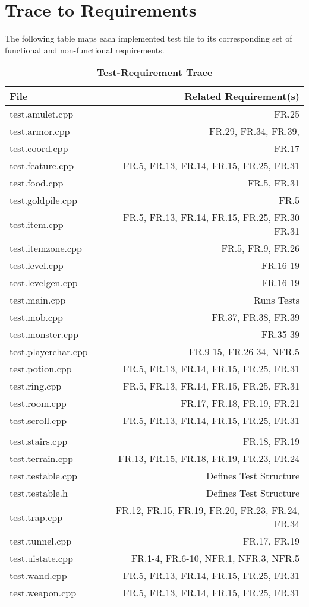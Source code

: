 \documentclass[12pt, titlepage]{article}
\newcommand{\newsection}[1]{\newpage\section{#1}}
\begin{document}
\newsection{Trace to Requirements} \label{Section_R_Trace}

	The following table maps each implemented test file to its corresponding set of functional and non-functional requirements. 

	\begin{table}[H] \label{TblMH}
		\caption{\bf Test-Requirement Trace}
		\centering
		\bigskip
		\def\arraystretch{1.04}
		\begin{tabular}{l r}
			\toprule
			\bf File & \bf Related Requirement(s)\\
			\midrule
			test.amulet.cpp 		& FR.25\\
			test.armor.cpp 			& FR.29, FR.34, FR.39,\\
			test.coord.cpp 			& FR.17\\
			test.feature.cpp 		& FR.5, FR.13, FR.14, FR.15, FR.25, FR.31\\
			test.food.cpp 			& FR.5, FR.31\\
			test.goldpile.cpp 		& FR.5\\
			test.item.cpp 			& FR.5, FR.13, FR.14, FR.15, FR.25, FR.30 FR.31\\
			test.itemzone.cpp 		& FR.5, FR.9, FR.26\\
			test.level.cpp 			& FR.16-19\\
			test.levelgen.cpp 		& FR.16-19\\
			test.main.cpp 			& Runs Tests\\
			test.mob.cpp 			& FR.37, FR.38, FR.39\\
			test.monster.cpp 		& FR.35-39\\
			test.playerchar.cpp 	& FR.9-15, FR.26-34, NFR.5\\
			test.potion.cpp 		& FR.5, FR.13, FR.14, FR.15, FR.25, FR.31\\
			test.ring.cpp 			& FR.5, FR.13, FR.14, FR.15, FR.25, FR.31\\
			test.room.cpp 			& FR.17, FR.18, FR.19, FR.21\\
			test.scroll.cpp 		& FR.5, FR.13, FR.14, FR.15, FR.25, FR.31\\\\
			test.stairs.cpp 		& FR.18, FR.19\\
			test.terrain.cpp 		& FR.13, FR.15, FR.18, FR.19, FR.23, FR.24\\
			test.testable.cpp 		& Defines Test Structure\\
			test.testable.h 		& Defines Test Structure\\
			test.trap.cpp 			& FR.12, FR.15, FR.19, FR.20, FR.23, FR.24, FR.34\\
			test.tunnel.cpp 		& FR.17, FR.19\\
			test.uistate.cpp 		& FR.1-4, FR.6-10, NFR.1, NFR.3, NFR.5\\
			test.wand.cpp 			& FR.5, FR.13, FR.14, FR.15, FR.25, FR.31\\
			test.weapon.cpp 		& FR.5, FR.13, FR.14, FR.15, FR.25, FR.31\\
			\hline
		\end{tabular}
	\end{table}
\end{document}
